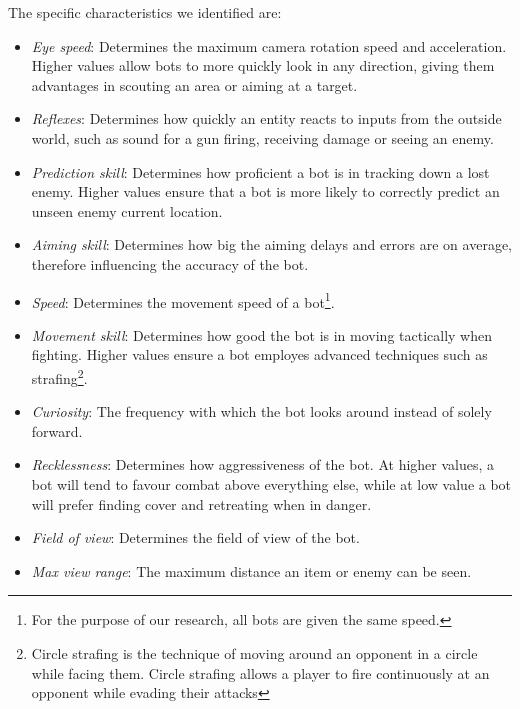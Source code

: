 The specific characteristics we identified are:
\begin{itemize}
\item \textit{Eye speed}: Determines the maximum camera rotation speed and acceleration. Higher values allow bots to more quickly look in any direction, giving them advantages in scouting an area or aiming at a target.
\item \textit{Reflexes}: Determines how quickly an entity reacts to inputs from the outside world, such as sound for a gun firing, receiving damage or seeing an enemy. 
\item \textit{Prediction skill}: Determines how proficient a bot is in tracking down a lost enemy. Higher values ensure that a bot is more likely to correctly predict an unseen enemy current location.
\item \textit{Aiming skill}: Determines how big the aiming delays and errors are on average, therefore influencing the accuracy of the bot.
\item \textit{Speed}: Determines the movement speed of a bot\footnote{For the purpose of our research, all bots are given the same speed.}.
\item \textit{Movement skill}: Determines how good the bot is in moving tactically when fighting. Higher values ensure a bot employes advanced techniques such as strafing\footnote{Circle strafing is the technique of moving around an opponent in a circle while facing them. Circle strafing allows a player to fire continuously at an opponent while evading their attacks}.
\item \textit{Curiosity}:  The frequency with which the bot looks around instead of solely forward.
\item \textit{Recklessness}: Determines how aggressiveness of the bot. At higher values, a bot will tend to favour combat above everything else, while at low value a bot will prefer finding cover and retreating when in danger.
\item \textit{Field of view}: Determines the field of view of the bot.
\item \textit{Max view range}: The maximum distance an item or enemy can be seen.
\end{itemize}

